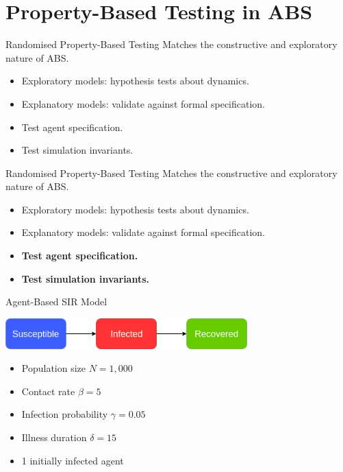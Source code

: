 \documentclass{beamer} %
\begin{document}
\section{Property-Based Testing in ABS}
\begin{frame}
\begin{block}{Randomised Property-Based Testing}
Matches the constructive and exploratory nature of ABS.
\end{block}

  \begin{itemize}
    \item Exploratory models: hypothesis tests about dynamics.
    \item Explanatory models: validate against formal specification.
    \item Test agent specification.
    \item Test simulation invariants.
  \end{itemize}
\end{frame}

\begin{frame}
\begin{block}{Randomised Property-Based Testing}
Matches the constructive and exploratory nature of ABS.
\end{block}

  \begin{itemize}
    \item Exploratory models: hypothesis tests about dynamics.
    \item Explanatory models: validate against formal specification.
    \item \textbf{Test agent specification.}
    \item \textbf{Test simulation invariants.}
  \end{itemize}
\end{frame}
  
\begin{frame}{Agent-Based SIR Model}
\begin{center}
\includegraphics[width=0.7\textwidth]{./fig/SIR_transitions.png}
\end{center}
  
  \begin{itemize}
    \item Population size $N = 1,000$
 	\item Contact rate $\beta = 5$
 	\item Infection probability $\gamma = 0.05$
 	\item Illness duration $\delta = 15$
 	\item 1 initially infected agent
  \end{itemize}
\end{frame}
\end{document}
